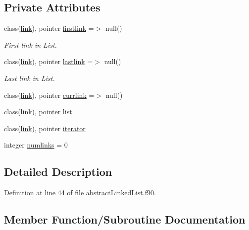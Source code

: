 \subsection*{Private Attributes}
\begin{DoxyCompactItemize}
\item 
class(\mbox{\hyperlink{structlink__mod_1_1link}{link}}), pointer \mbox{\hyperlink{structabstract__linkedlist__mod_1_1linkedlist_a1db1fbb6e3acfb39a2cab68396f31867}{firstlink}} =$>$ null()
\begin{DoxyCompactList}\small\item\em First link in List. \end{DoxyCompactList}\item 
class(\mbox{\hyperlink{structlink__mod_1_1link}{link}}), pointer \mbox{\hyperlink{structabstract__linkedlist__mod_1_1linkedlist_af9747ed213a31f13aef74f95f014a503}{lastlink}} =$>$ null()
\begin{DoxyCompactList}\small\item\em Last link in List. \end{DoxyCompactList}\item 
class(\mbox{\hyperlink{structlink__mod_1_1link}{link}}), pointer \mbox{\hyperlink{structabstract__linkedlist__mod_1_1linkedlist_a5039a762fe6e50feda0265f14386c478}{currlink}} =$>$ null()
\item 
class(\mbox{\hyperlink{structlink__mod_1_1link}{link}}), pointer \mbox{\hyperlink{structabstract__linkedlist__mod_1_1linkedlist_aa01c4be95b38ef7dd93c4cc550108f1d}{list}}
\item 
class(\mbox{\hyperlink{structlink__mod_1_1link}{link}}), pointer \mbox{\hyperlink{structabstract__linkedlist__mod_1_1linkedlist_a96f2e50678291a2552e6c2cc54bc288d}{iterator}}
\item 
integer \mbox{\hyperlink{structabstract__linkedlist__mod_1_1linkedlist_a943157fc98cf02c94ed8fb50379a5e62}{numlinks}} = 0
\end{DoxyCompactItemize}


\subsection{Detailed Description}


Definition at line 44 of file abstract\+Linked\+List.\+f90.



\subsection{Member Function/\+Subroutine Documentation}
\mbox{\label{structabstract__linkedlist__mod_1_1linkedlist_a691374958da432e733453e6feb895bb1}} 

